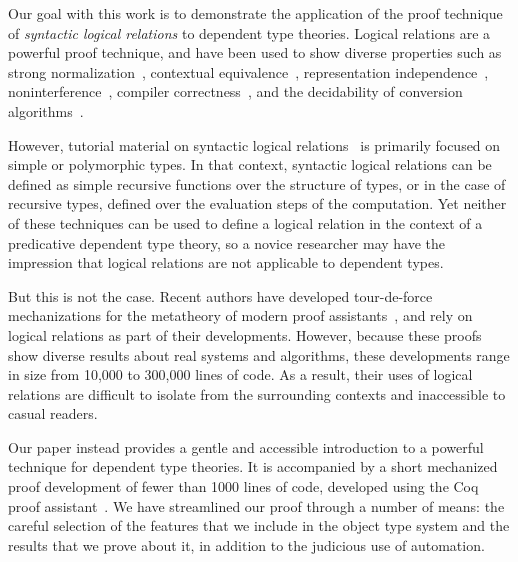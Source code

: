 \documentclass[\ifpublic nolinenum\else\fi,online,OA]{jfp}
\newcommand{\scw}[1]{}
\newcommand{\yl}[1]{}
\theoremstyle{definition}
\begin{document}
Our goal with this work is to demonstrate the application of the proof
technique of \emph{syntactic logical relations} to dependent type theories.
Logical relations are a powerful proof technique, and have been used to show
diverse properties such as strong normalization~\citep{girard1989proofs,
  geuvers1994short}, contextual equivalence~\citep{constable1986implementing},
representation independence~\citep{pitts1998existential},
noninterference~\citep{bowman2015noninterference}, compiler
correctness~\citep{benton2009biorthogonality,perconti2014compiler}, and the
decidability of conversion
algorithms~\citep{harper2005equivalence,Abel12,abel2013normalization}.

However, tutorial material on syntactic logical
relations~\citep{skorstengaard2019introduction, harpertait, harperkripke,
  pierce2002types, pierce2004advanced,harper2016practical} is primarily
focused on simple or polymorphic types. In that context,
syntactic logical relations can be defined as simple recursive functions over
the structure of types, or in the case of recursive types, defined over the
evaluation steps of the computation. Yet neither of these techniques can be
used to define a logical relation in the context of a predicative dependent
type theory, so a novice researcher may have the impression
that logical relations are not applicable to dependent types.

But this is not the case. 
Recent authors have developed tour-de-force
mechanizations for the metatheory of modern proof
assistants~\citep{nbeincoq,decagda,martin-lof-a-la-coq,anand2014towards}, and
rely on logical relations as part of their
developments. However, because these proofs show diverse results about real
systems and algorithms, these developments range in size from 10,000 to
300,000 lines of code. As a result, their uses of logical relations are
difficult to isolate from the surrounding contexts and inaccessible
to casual readers.

Our paper instead provides a gentle and accessible introduction to a powerful
technique for dependent type theories.
It is accompanied by a short mechanized proof development
of fewer than 1000 lines of code, developed using the Coq proof
assistant~\citep{coq}.
We have streamlined our proof through a number of means: the careful selection
of the features that we include in the object type system and the results that
we prove about it, in addition to the judicious use of automation.
\end{document}
